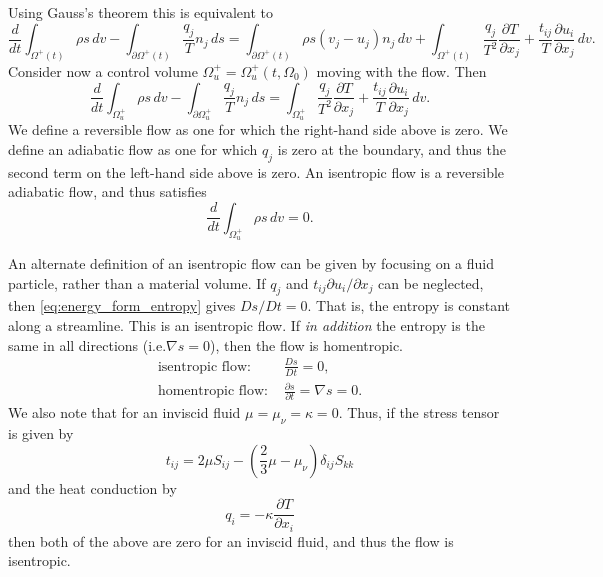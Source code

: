 \documentclass[oneside,a4paper,11pt]{report}
\begin{document}
Using Gauss's theorem this is equivalent to
\begin{equation*}
    \frac{d}{dt} \int_{\Omega^+(t)} \rho s \, dv - \int_{\partial \Omega^+(t)} \frac{q_j}{T} n_j \,ds = \int_{\partial \Omega^+(t)} \rho s \left (v_j - u_j \right ) n_j \, dv + \int_{\Omega^+(t)} \frac{q_j}{T^2}\frac{\partial T}{\partial x_j} + \frac{t_{ij}}{T} \frac{\partial u_i}{\partial x_j} \, dv.
\end{equation*}
Consider now a control volume $\Omega^+_u=\Omega^+_u(t,\Omega_0)$ moving with the flow. Then
\begin{equation}
    \frac{d}{dt} \int_{\Omega^+_u} \rho s \, dv - \int_{\partial \Omega^+_u} \frac{q_j}{T} n_j \,ds = \int_{\Omega^+_u} \frac{q_j}{T^2}\frac{\partial T}{\partial x_j} + \frac{t_{ij}}{T} \frac{\partial u_i}{\partial x_j} \, dv.
\end{equation}
We define a reversible flow as one for which the right-hand side above is zero. We define an adiabatic flow as one for which $q_j$ is zero at the boundary, and thus the second term on the left-hand side above is zero. An isentropic flow is a reversible adiabatic flow, and thus satisfies
\begin{equation}
    \frac{d}{dt} \int_{\Omega^+_u} \rho s \, dv = 0.
\end{equation}

An alternate definition of an isentropic flow can be given by focusing on a fluid particle, rather than a material volume. If $q_j$ and $t_{ij} \partial u_i / \partial x_j$ can be neglected, then \cref{eq:energy_form_entropy} gives $Ds/Dt = 0$. That is, the entropy is constant along a streamline. This is an isentropic flow. If \textit{in addition} the entropy is the same in all directions (i.e.\@ $\nabla s = 0$), then the flow is homentropic. 
\begin{align}
    \text{isentropic flow:   }& \frac{Ds}{Dt} = 0, \\
    \text{homentropic flow:   }& \frac{\partial s}{\partial t} = \nabla s = 0.
\end{align}
We also note that for an inviscid fluid $\mu = \mu_\nu = \kappa = 0$. Thus, if the stress tensor is given by
\begin{equation}
    t_{ij} = 2 \mu S_{ij} - \left( \frac{2}{3} \mu - \mu_\nu \right) \delta_{ij} S_{kk}
\end{equation}
and the heat conduction by
\begin{equation}
    q_i = -\kappa \frac{\partial T}{\partial x_i}
\end{equation}
then both of the above are zero for an inviscid fluid, and thus the flow is isentropic.
\end{document}
